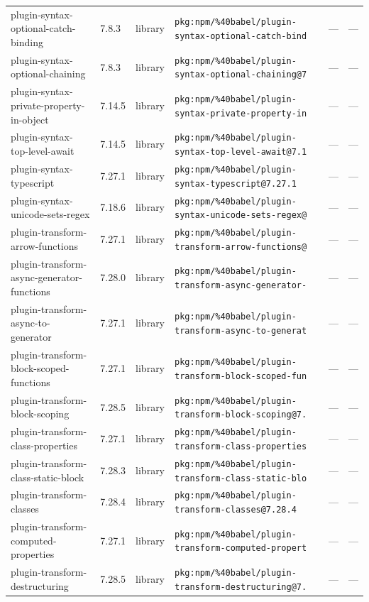 \documentclass[11pt]{article}
\begin{document}
\begin{longtable}{|l|l|l|p{2.2cm}|l|p{4cm}|}
plugin-syntax-optional-catch-binding & 7.8.3 & library & \texttt{pkg:npm/\%40babel/plugin-syntax-optional-catch-bind} & — & — \\
plugin-syntax-optional-chaining & 7.8.3 & library & \texttt{pkg:npm/\%40babel/plugin-syntax-optional-chaining@7} & — & — \\
plugin-syntax-private-property-in-object & 7.14.5 & library & \texttt{pkg:npm/\%40babel/plugin-syntax-private-property-in} & — & — \\
plugin-syntax-top-level-await & 7.14.5 & library & \texttt{pkg:npm/\%40babel/plugin-syntax-top-level-await@7.1} & — & — \\
plugin-syntax-typescript & 7.27.1 & library & \texttt{pkg:npm/\%40babel/plugin-syntax-typescript@7.27.1} & — & — \\
plugin-syntax-unicode-sets-regex & 7.18.6 & library & \texttt{pkg:npm/\%40babel/plugin-syntax-unicode-sets-regex@} & — & — \\
plugin-transform-arrow-functions & 7.27.1 & library & \texttt{pkg:npm/\%40babel/plugin-transform-arrow-functions@} & — & — \\
plugin-transform-async-generator-functions & 7.28.0 & library & \texttt{pkg:npm/\%40babel/plugin-transform-async-generator-} & — & — \\
plugin-transform-async-to-generator & 7.27.1 & library & \texttt{pkg:npm/\%40babel/plugin-transform-async-to-generat} & — & — \\
plugin-transform-block-scoped-functions & 7.27.1 & library & \texttt{pkg:npm/\%40babel/plugin-transform-block-scoped-fun} & — & — \\
plugin-transform-block-scoping & 7.28.5 & library & \texttt{pkg:npm/\%40babel/plugin-transform-block-scoping@7.} & — & — \\
plugin-transform-class-properties & 7.27.1 & library & \texttt{pkg:npm/\%40babel/plugin-transform-class-properties} & — & — \\
plugin-transform-class-static-block & 7.28.3 & library & \texttt{pkg:npm/\%40babel/plugin-transform-class-static-blo} & — & — \\
plugin-transform-classes & 7.28.4 & library & \texttt{pkg:npm/\%40babel/plugin-transform-classes@7.28.4} & — & — \\
plugin-transform-computed-properties & 7.27.1 & library & \texttt{pkg:npm/\%40babel/plugin-transform-computed-propert} & — & — \\
plugin-transform-destructuring & 7.28.5 & library & \texttt{pkg:npm/\%40babel/plugin-transform-destructuring@7.} & — & — \\

\end{longtable}
\end{document}

